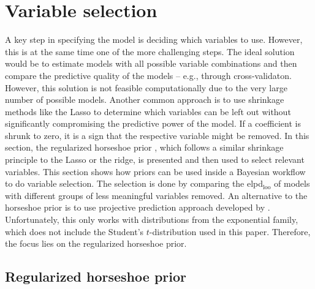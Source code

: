\section{Variable selection}
\label{ch:varsel}
A key step in specifying the model is deciding which variables to use.
However, this is at the same time one of the more challenging steps.
The ideal solution would be to estimate models with all possible variable combinations and then compare the predictive quality of the models – e.g., through cross-validaton.
However, this solution is not feasible computationally due to the very large number of possible models.
Another common approach is to use shrinkage methods like the Lasso \citep{tibshirani_regression_1996} to determine which variables can be left out without significantly compromising the predictive power of the model.
If a coefficient is shrunk to zero, it is a sign that the respective variable might be removed.
In this section, the regularized horseshoe prior \citep{piironen_sparsity_2017}, which follows a similar shrinkage principle to the Lasso or the ridge, is presented and then used to select relevant variables.
This section shows how priors can be used inside a Bayesian workflow to do variable selection.
The selection is done by comparing the elpd$_{\text{loo}}$ of models with different groups of less meaningful variables removed. An alternative to the horseshoe prior is to use projective prediction approach developed by \cite{piironen_projective_2020}.
Unfortunately, this only works with distributions from the exponential family, which does not include the Student's $t$-distribution used in this paper.
Therefore, the focus lies on the regularized horseshoe prior.

\subsection{Regularized horseshoe prior}

